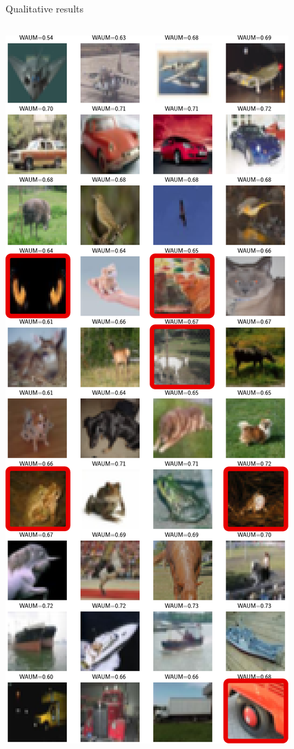 \begin{frame}{Qualitative results}{}
\begin{columns}
\begin{column}{.3\textwidth}
        \centering
           \includegraphics[width=\textwidth, clip, trim={0cm 0cm 0cm 12cm}]{../chapters/images/lowest_waums_cut.pdf}


\end{column}
\end{columns}
\end{frame}
